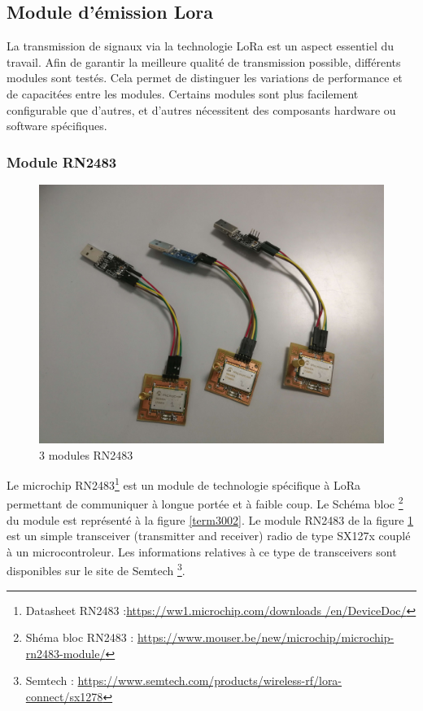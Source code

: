 \subsection{Module d'émission Lora}

La transmission de signaux via la technologie \ac{LoRa} est un aspect essentiel du travail. Afin de garantir la meilleure qualité de transmission possible, différents modules sont testés. Cela permet de distinguer les variations de performance et de capacitées entre les modules. Certains modules sont plus facilement configurable que d'autres, et d'autres nécessitent des composants hardware ou software spécifiques.

\subsubsection{Module RN2483}

\begin{figure}[h]
\centering

\includegraphics[scale=0.08]{images/rn2483.png}
\caption{3 modules RN2483}\label{term34}
\end{figure}


Le microchip RN2483\footnote{Datasheet RN2483 :\href{https://ww1.microchip.com/downloads/en/DeviceDoc/40001784B.pdf}{https://ww1.microchip.com/downloads
/en/DeviceDoc/}} est un module de technologie spécifique à LoRa permettant de communiquer à longue portée et à faible coup. Le Schéma bloc \footnote{Shéma bloc RN2483 : \href{https://www.mouser.be/new/microchip/microchip-rn2483-module/}{https://www.mouser.be/new/microchip/microchip-rn2483-module/}} du module est représenté à la figure \ref{term3002}. Le module RN2483 de la figure \ref{term34} est un simple transceiver (transmitter and receiver) radio de type SX127x couplé à un microcontroleur. Les informations relatives à ce type de transceivers sont disponibles sur le site de Semtech \footnote{Semtech : \href{https://www.semtech.com/products/wireless-rf/lora-connect/sx1278}{https://www.semtech.com/products/wireless-rf/lora-connect/sx1278}}.


